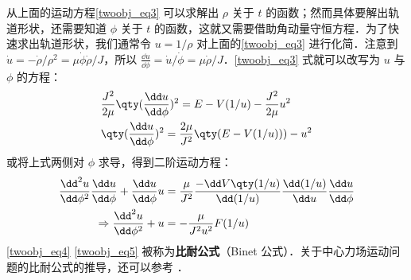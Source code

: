 从上面的运动方程\autoref{twoobj_eq3} 可以求解出 $\rho$ 关于 $t$ 的函数；然而具体要解出轨道形状，还需要知道 $\phi$ 关于 $t$ 的函数，这就又需要借助角动量守恒方程．为了快速求出轨道形状，我们通常令 $u=1/\rho$ 对上面的\autoref{twoobj_eq3} 进行化简．注意到 $\dot u=-\dot \rho/\rho^2=\mu\dot \phi\dot \rho/J$，所以 $\frac{\dd u}{\dd \phi}=\dot u/\dot \phi=\mu\dot \rho/J$．\autoref{twoobj_eq3} 式就可以改写为 $u$ 与 $\phi$ 的方程：
\begin{equation}\label{twoobj_eq4}
\begin{aligned}
&\frac{J^2}{2\mu} \qty(\frac{\dd u}{\dd \phi})^2=E-V(1/u)-\frac{J^2}{2\mu} u^2\\
&\qty(\frac{\dd u}{\dd \phi})^2=\frac{2\mu}{J^2}\qty(E-V(1/u)))-u^2
\end{aligned}
\end{equation}
或将上式两侧对 $\phi$ 求导，得到二阶运动方程：
\begin{equation}\label{twoobj_eq5}
\begin{aligned}
\frac{{\dd}^2 u}{\dd \phi^2}\frac{\dd u}{\dd \phi}+\frac{\dd u}{\dd \phi}u&=\frac{\mu}{J^2}\frac{-\dd V\qty(1/u)}{\dd (1/u)}\frac{\dd (1/u)}{\dd u}\frac{\dd u}{\dd \phi}
\\
\Rightarrow 
\frac{{\dd}^2 u}{\dd \phi^2}+u&=-\frac{\mu}{J^2u^2}F(1/u)
\end{aligned}
\end{equation}
\autoref{twoobj_eq4} \autoref{twoobj_eq5} 被称为\textbf{比耐公式}（Binet 公式）．关于中心力场运动问题的比耐公式的推导，还可以参考 ．

